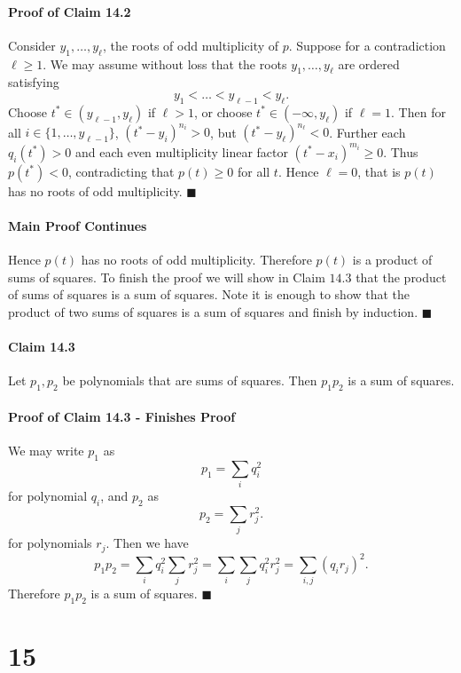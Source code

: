 \documentclass[letterpaper,12pt,oneside,onecolumn]{article}
\newcommand{\1}{\mathbbm{1}}
\begin{document}
\paragraph{Proof of Claim 14.2}
Consider $y_1, \dots, y_\ell$, the roots of odd multiplicity of $p$. Suppose for a contradiction $\ell \geq 1$. We may assume without loss that the roots $y_1, \dots, y_\ell$ are ordered satisfying
$$y_1 < \dots < y_{\ell -1}< y_\ell.$$
Choose $t^* \in (y_{\ell-1}, y_\ell)$ if $\ell >1$, or choose $t^* \in (-\infty, y_\ell)$ if $\ell = 1$. Then for all $i \in \{1, \dots, y_{\ell - 1}\}$, $(t^* - y_i)^{n_i} > 0$, but $(t^* - y_\ell)^{n_\ell} < 0$. Further each $q_i(t^*) > 0$ and each even multiplicity linear factor $(t^* - x_i)^{m_i} \geq 0$. Thus $p(t^*) < 0$, contradicting that $p(t) \geq 0$ for all $t$. Hence $\ell = 0$, that is $p(t)$ has no roots of odd multiplicity. $\blacksquare$
\paragraph{Main Proof Continues}
Hence $p(t)$ has no roots of odd multiplicity. Therefore $p(t)$ is a product of sums of squares. To finish the proof we will show in Claim $14.3$ that the product of sums of squares is a sum of squares. Note it is enough to show that the product of two sums of squares is a sum of squares and finish by induction. $\blacksquare$
\paragraph{Claim 14.3}
Let $p_1,p_2$ be polynomials that are sums of squares. Then $p_1p_2$ is a sum of squares.
\paragraph{Proof of Claim 14.3 - Finishes Proof}
We may write $p_1$ as
$$p_1 = \sum_i q_i^2$$
for polynomial $q_i$, and $p_2$ as 
$$p_2 = \sum_j r_j^2.$$
for polynomials $r_j$. Then we have
$$p_1p_2 = \sum_i q_i^2 \sum_j r_j^2 = \sum_i\sum_j q_i^2r_j^2 = \sum_{i,j} (q_ir_j)^2.$$
Therefore $p_1p_2$ is a sum of squares. $\blacksquare$
\section*{15}
\end{document}
